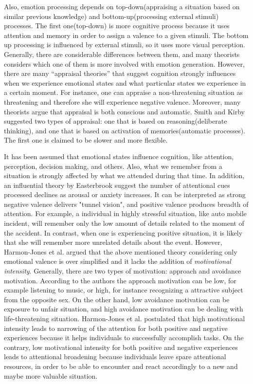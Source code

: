 \documentclass[a4paper]{report}
\begin{document}
		Also, emotion processing depends on top-down(appraising a situation based on similar previous knowledge) and bottom-up(processing external stimuli) processes. The first one(top-down) is more cognitive process because it uses attention and memory in order to assign a valence to a given stimuli. The bottom up processing is influenced by external stimuli, so it uses more visual perception. Generally, there are considerable differences between them, and many theorists considers which one of them is more involved with emotion generation. However, there are many ``appraisal theories'' that suggest cognition strongly influences when we experience emotional states and what particular states we experience in a certain moment. For instance, one can appraise a non-threatening situation as threatening and therefore she will experience negative valence. Moreover, many theorists argue that appraisal is both conscious and automatic. Smith and Kirby\cite{smith2009putting} suggested two types of appraisal: one that is based on reasoning(deliberate thinking), and one that is based on activation of memories(automatic processes). The first one is claimed to be slower and more flexible. 
		
		It has been assumed that emotional states influence cognition\cite{blanchette2010influence}, like attention, perception, decision making, and others. Also, what we remember from a situation is strongly affected by what we attended during that time\cite{eriksen1986visual}. In addition, an influential theory by Easterbrook\cite{easterbrook1959effect} suggest the number of attentional cues processed declines as arousal or anxiety increases. It can be interpreted as strong negative valence delivers "tunnel vision", and positive valence produces breadth of attention. For example, a individual in highly stressful situation, like auto mobile incident, will remember only the low amount of details related to the moment of the accident. In contrast, when one is experiencing positive situation, it is likely that she will remember more unrelated details about the event. However, Harmon-Jones et al.\cite{harmon2011toward} argued that the above mentioned theory considering only emotional valence is over simplified and it lacks the addition of \textit{motivational intensity}. Generally, there are two types of motivation: approach and avoidance motivation. According to the authors the approach motivation can be low, for example listening to music, or high, for instance recognizing a attractive subject from the opposite sex. On the other hand, low avoidance motivation can be exposure to unfair situation, and high avoidance motivation can be dealing with life-threatening situation. Harmon-Jones et al.\cite{harmon2011toward} postulated that high motivational intensity leads to narrowing of the attention for both positive and negative experiences because it helps individuals to successfully accomplish tasks. On the contrary, low motivational intensity for both positive and negative experiences leads to attentional broadening because individuals leave spare attentional resources, in order to be able to encounter and react accordingly to a new and maybe more valuable situation.
		
\end{document}
